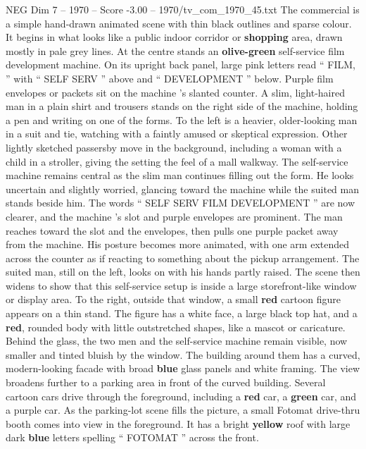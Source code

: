 \begin{textsample}{NEG Dim 7 – 1970 – Score -3.00 – 1970/tv\_com\_1970\_45.txt}  \label{ex:f7_neg_065}
The commercial is a simple hand-drawn animated scene with thin black outlines and sparse colour.
It begins in what looks like a public indoor corridor or \textbf{shopping} area, drawn mostly in pale grey lines.
At the centre stands an \textbf{olive-green} self-service film development machine.
On its upright back panel, large pink letters read “ FILM, ” with “ SELF SERV ” above and “ DEVELOPMENT ” below.
Purple film envelopes or packets sit on the machine ’s slanted counter.
A slim, light-haired man in a plain shirt and trousers stands on the right side of the machine, holding a pen and writing on one of the forms.
To the left is a heavier, older-looking man in a suit and tie, watching with a faintly amused or skeptical expression.
Other lightly sketched passersby move in the background, including a woman with a child in a stroller, giving the setting the feel of a mall walkway.
The self-service machine remains central as the slim man continues filling out the form.
He looks uncertain and slightly worried, glancing toward the machine while the suited man stands beside him.
The words “ SELF SERV FILM DEVELOPMENT ” are now clearer, and the machine ’s slot and purple envelopes are prominent.
The man reaches toward the slot and the envelopes, then pulls one purple packet away from the machine.
His posture becomes more animated, with one arm extended across the counter as if reacting to something about the pickup arrangement.
The suited man, still on the left, looks on with his hands partly raised.
The scene then widens to show that this self-service setup is inside a large storefront-like window or display area.
To the right, outside that window, a small \textbf{red} cartoon figure appears on a thin stand.
The figure has a white face, a large black top hat, and a \textbf{red}, rounded body with little outstretched shapes, like a mascot or caricature.
Behind the glass, the two men and the self-service machine remain visible, now smaller and tinted bluish by the window.
The building around them has a curved, modern-looking facade with broad \textbf{blue} glass panels and white framing.
The view broadens further to a parking area in front of the curved building.
Several cartoon cars drive through the foreground, including a \textbf{red} car, a \textbf{green} car, and a purple car.
As the parking-lot scene fills the picture, a small Fotomat drive-thru booth comes into view in the foreground.
It has a bright \textbf{yellow} roof with large dark \textbf{blue} letters spelling “ FOTOMAT ” across the front.

\end{textsample}
